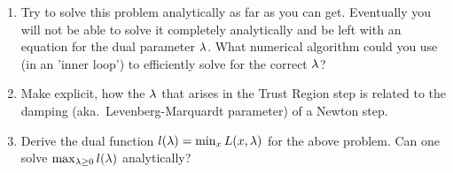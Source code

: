 \begin{enumerate}
\item Try to solve this problem analytically as far as you can get. Eventually  you will not be able to solve it completely analytically and be left with an equation for the dual parameter $\lambda$. What numerical algorithm could you use (in an 'inner loop') to efficiently solve for the correct $\lambda$?

\item Make explicit, how the $\lambda$ that arises in the Trust Region step is related to the damping (aka.\ Levenberg-Marquardt parameter) of a Newton step.

\item Derive the dual function $l(\lambda) = \min_x L(x,\lambda)$ for the above problem. Can one solve $\max_{\lambda\ge0} l(\lambda)$ analytically?
\end{enumerate}



\exerfoot
